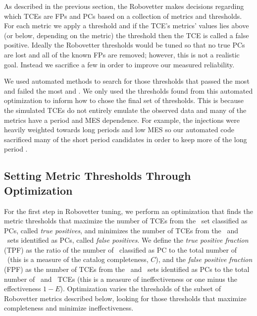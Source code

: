 \label{s:optimize}
As described in the previous section, the Robovetter makes decisions regarding which TCEs are FPs and PCs based on a collection of metrics and thresholds.  For each metric we apply a threshold and if the TCE's metrics' values lies above (or below, depending on the metric) the threshold then the TCE is called a false positive.  Ideally the Robovetter thresholds would be tuned so that no true PCs are lost and all of the known FPs are removed; however, this is not a realistic goal.  Instead we sacrifice a few  in order to improve our measured reliability. 

We used automated methods to search for those thresholds that passed the most  and failed the most  and . We only used the thresholds found from this automated optimization to inform how to chose the final set of thresholds. This is because the simulated TCEs do not entirely emulate the observed data and many of the metrics have a period and MES dependence.  For example, the injections were heavily weighted towards long periods and low MES so our automated code sacrificed many of the short period candidates in order to keep more of the long period 
. 




\subsection{Setting Metric Thresholds Through Optimization}
\label{s:full_optimize}
For the first step in Robovetter tuning, we perform an optimization that finds the metric thresholds that maximize the number of TCEs from the \injtce\ set classified as PCs, called {\it true positives}, and minimizes the number of TCEs from the \scrtce\ and \invtce\ sets identified as PCs, called {\it false positives}.  We define the {\it true positive fraction} (TPF) as the ratio of the number of \injtce\  classified as PC to the total number of \injtce\ (this is a measure of the catalog completeness, $C$), and the {\it false positive fraction} (FPF) as the number of TCEs from the \scrtce\ and \invtce\ sets identified as PCs to the total number of \scrtce\ and \invtce\ TCEs (this is a measure of ineffectiveness or one minus the effectiveness $1-E$).  Optimization varies the thresholds of the subset of Robovetter metrics described below, looking for those thresholds that maximize completeness and minimize ineffectiveness.

